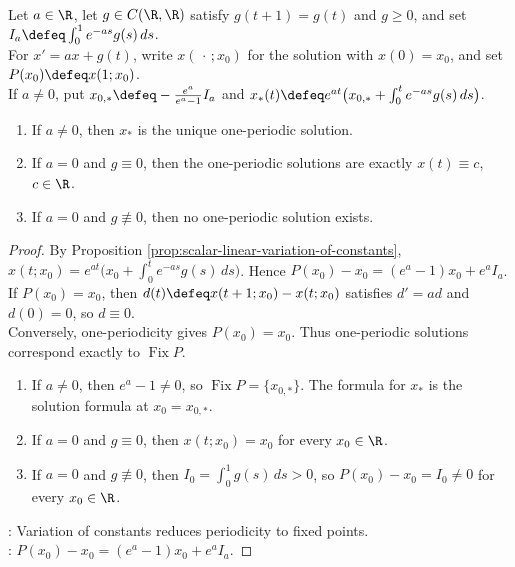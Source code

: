 \begin{proposition} \label{prop:linear-periodic-forcing-classification} \\
Let $a\in\R$, let $g\in C(\R,\R)$ satisfy $g(t+1)=g(t)$ and $g\geq0$, and set $I_a\defeq\int_0^1e^{-as}g(s)\,ds$.\\
For $x'=ax+g(t)$, write $x(\,\cdot\,;x_0)$ for the solution with $x(0)=x_0$, and set $P(x_0)\defeq x(1;x_0)$.\\
If $a\neq0$, put $x_{0,*}\defeq-\frac{e^a}{e^a-1}I_a$ and $x_*(t)\defeq e^{at}\bigl(x_{0,*}+\int_0^te^{-as}g(s)\,ds\bigr)$.
\begin{enumerate}[label=(\roman*)]
\setlength{\itemsep}{0pt}
\item If $a\neq0$, then $x_*$ is the unique one-periodic solution.
\item If $a=0$ and $g\equiv0$, then the one-periodic solutions are exactly $x(t)\equiv c$, $c\in\R$.
\item If $a=0$ and $g\not\equiv0$, then no one-periodic solution exists.
\end{enumerate}
\begin{proof}
By Proposition \ref{prop:scalar-linear-variation-of-constants}, $x(t;x_0)=e^{at}\bigl(x_0+\int_0^te^{-as}g(s)\,ds\bigr)$. Hence $P(x_0)-x_0=(e^a-1)x_0+e^aI_a$.\\
If $P(x_0)=x_0$, then $d(t)\defeq x(t+1;x_0)-x(t;x_0)$ satisfies $d'=ad$ and $d(0)=0$, so $d\equiv0$.\\
Conversely, one-periodicity gives $P(x_0)=x_0$. Thus one-periodic solutions correspond exactly to $\operatorname{Fix}P$.
\begin{enumerate}[label=(\roman*)]
\setlength{\itemsep}{0pt}
\item If $a\neq0$, then $e^a-1\neq0$, so $\operatorname{Fix}P=\{x_{0,*}\}$. The formula for $x_*$ is the solution formula at $x_0=x_{0,*}$.
\item If $a=0$ and $g\equiv0$, then $x(t;x_0)=x_0$ for every $x_0\in\R$.
\item If $a=0$ and $g\not\equiv0$, then $I_0=\int_0^1g(s)\,ds>0$, so $P(x_0)-x_0=I_0\neq0$ for every $x_0\in\R$.
\end{enumerate}
: Variation of constants reduces periodicity to fixed points.\\
: $P(x_0)-x_0=(e^a-1)x_0+e^aI_a$.
\end{proof}
\end{proposition}

